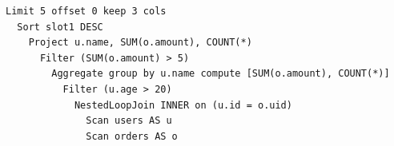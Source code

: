 \begin{lstlisting}[]
Limit 5 offset 0 keep 3 cols
  Sort slot1 DESC
    Project u.name, SUM(o.amount), COUNT(*)
      Filter (SUM(o.amount) > 5)
        Aggregate group by u.name compute [SUM(o.amount), COUNT(*)]
          Filter (u.age > 20)
            NestedLoopJoin INNER on (u.id = o.uid)
              Scan users AS u
              Scan orders AS o
\end{lstlisting}

